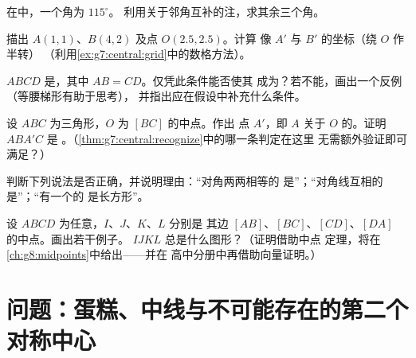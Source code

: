 \begin{exercise}[$\star$]\label{exo:g7:central:6}
在中，一个角为 $115^\circ$。
利用关于邻角互补的注，求其余三个角。
\end{exercise}

\begin{exercise}[$\star\star$]\label{exo:g7:central:7}
描出 $A(1, 1)$、$B(4, 2)$ 及点 $O(2.5, 2.5)$。计算
像 $A'$ 与 $B'$ 的坐标（绕 $O$ 作半转）
（利用\cref{ex:g7:central:grid}中的数格方法）。
\end{exercise}

\begin{exercise}[$\star\star$]\label{exo:g7:central:8}
$ABCD$ 是，其中 $AB = CD$。仅凭此条件能否使其
成为？若不能，画出一个反例（等腰梯形有助于思考），
并指出应在假设中补充什么条件。
\end{exercise}

\begin{exercise}[$\star\star$]\label{exo:g7:central:9}
设 $ABC$ 为三角形，$O$ 为 $[BC]$ 的中点。作出
点 $A'$，即 $A$ 关于 $O$ 的。证明 $ABA'C$ 是
。（\cref{thm:g7:central:recognize}中的哪一条判定在这里
无需额外验证即可满足？）
\end{exercise}

\begin{exercise}[$\star\star$]\label{exo:g7:central:10}
判断下列说法是否正确，并说明理由：“对角两两相等的
是”；“对角线互相的
是”；“有一个的
是长方形”。
\end{exercise}

\begin{exercise}[$\star\star\star$]\label{exo:g7:central:11}
设 $ABCD$ 为任意，$I$、$J$、$K$、$L$ 分别是
其边 $[AB]$、$[BC]$、$[CD]$、$[DA]$ 的中点。画出若干例子。
$IJKL$ 总是什么图形？（证明借助中点
定理，将在\cref{ch:g8:midpoints}中给出——并在
高中分册中再借助向量证明。）
\end{exercise}

\section{问题：蛋糕、中线与不可能存在的第二个
对称中心}

